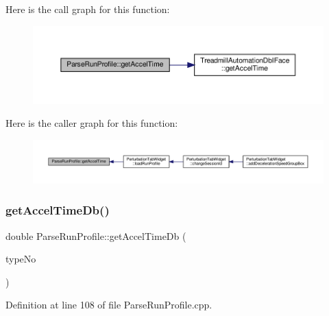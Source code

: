 Here is the call graph for this function\+:
\nopagebreak
\begin{figure}[H]
\begin{center}
\leavevmode
\includegraphics[width=350pt]{class_parse_run_profile_a9a53b91ed996a2730f84c93946576e6a_cgraph}
\end{center}
\end{figure}
Here is the caller graph for this function\+:
\nopagebreak
\begin{figure}[H]
\begin{center}
\leavevmode
\includegraphics[width=350pt]{class_parse_run_profile_a9a53b91ed996a2730f84c93946576e6a_icgraph}
\end{center}
\end{figure}
\mbox{\label{class_parse_run_profile_a94a349a23a034367a6bdf770a8e4514b}} 
\subsubsection{\texorpdfstring{get\+Accel\+Time\+Db()}{getAccelTimeDb()}}
{\footnotesize\ttfamily double Parse\+Run\+Profile\+::get\+Accel\+Time\+Db (\begin{DoxyParamCaption}\item[{Q\+String}]{type\+No }\end{DoxyParamCaption})}



Definition at line 108 of file Parse\+Run\+Profile.\+cpp.

